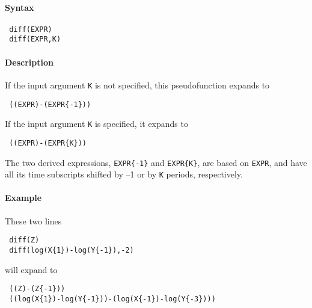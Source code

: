 


	\paragraph{Syntax}
 
 \begin{verbatim}
 diff(EXPR)
 diff(EXPR,K)
 \end{verbatim}
 
 \paragraph{Description}
 
 If the input argument \texttt{K} is not specified, this pseudofunction
 expands to
 
 \begin{verbatim}
 ((EXPR)-(EXPR{-1}))
 \end{verbatim}
 
 If the input argument \texttt{K} is specified, it expands to
 
 \begin{verbatim}
 ((EXPR)-(EXPR{K}))
 \end{verbatim}
 
 The two derived expressions, \texttt{EXPR\{-1\}} and \texttt{EXPR\{K\}},
 are based on \texttt{EXPR}, and have all its time subscripts shifted by
 --1 or by \texttt{K} periods, respectively.
 
 \paragraph{Example}
 
 These two lines
 
 \begin{verbatim}
 diff(Z)
 diff(log(X{1})-log(Y{-1}),-2)
 \end{verbatim}
 
 will expand to
 
 \begin{verbatim}
 ((Z)-(Z{-1}))
 ((log(X{1})-log(Y{-1}))-(log(X{-1})-log(Y{-3})))
 \end{verbatim}


